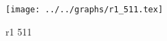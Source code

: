 \begin{figure}[h] \centering \texttt{[image: ../../graphs/r1\_511.tex]}\caption{r1 511}\label{gr:r1_511} \end{figure}
